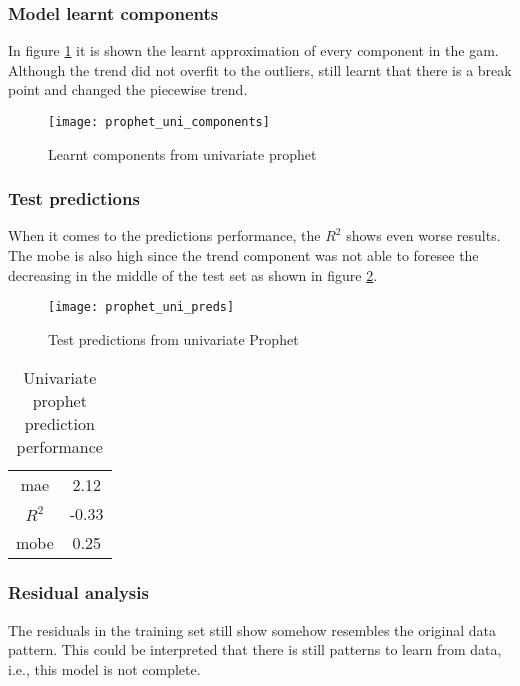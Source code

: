 \subsubsection*{Model learnt components}

In figure \ref{fig:prophet_uni_components} it is shown the learnt approximation of every component in the \ac{gam}. Although the trend did not overfit to the outliers, still learnt that there is a break point and changed the piecewise trend.

\begin{figure}[H]
	\centering
	\texttt{[image: prophet\_uni\_components]}
	\caption{Learnt components from univariate prophet}
	\label{fig:prophet_uni_components}
\end{figure}

\pagebreak
\subsubsection*{Test predictions}

When it comes to the predictions performance, the $R^2$ shows even worse results. The \ac{mobe} is also high since the trend component was not able to foresee the decreasing in the middle of the test set as shown in figure \ref{fig:prophet_uni_preds}. 

\begin{figure}[H]
	\centering
	\texttt{[image: prophet\_uni\_preds]}
	\caption{Test predictions from univariate Prophet}
	\label{fig:prophet_uni_preds}
\end{figure}

\begin{table}[H]
	\centering
	\begin{tabular}{|c|c|}
		\hline
		\ac{mae} 	& 2.12 \\
		$R^2$ 		& -0.33 \\
		\ac{mobe} 	& 0.25 \\
		\hline
	\end{tabular}
	\caption{Univariate prophet prediction performance}
	\label{table:prophet_uni_test_scores}
\end{table}




\subsubsection*{Residual analysis}

The residuals in the training set still show somehow resembles the original data pattern. This could be interpreted that there is still patterns to learn from data, i.e., this model is not complete. 

